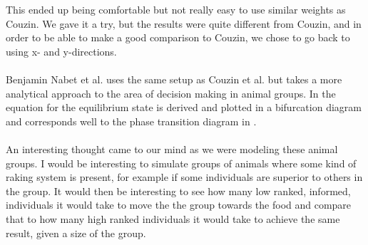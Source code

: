 This ended up being comfortable but not really easy to use similar weights as Couzin. 
We gave it a try, but the results were quite different from Couzin, and in order to be able to make a good comparison to Couzin, we chose to go back to using x- and y-directions.
\\\\
Benjamin Nabet et al. uses the same setup as Couzin et al. but takes a more analytical approach to the area of decision making in animal groups. 
In \cite{anArticle} the equation for the equilibrium state is derived and plotted in a bifurcation diagram and corresponds well to the phase transition diagram in \cite{theArticle}.
\\\\
An interesting thought came to our mind as we were modeling these animal groups. 
I would be interesting to simulate groups of animals where some kind of raking system is present, for example if some individuals are superior to others in the group.
It would then be interesting to see how many low ranked, informed, individuals it would take to move the the group towards the food and compare that to how many high ranked individuals it would take to achieve the same result, given a size of the group.
